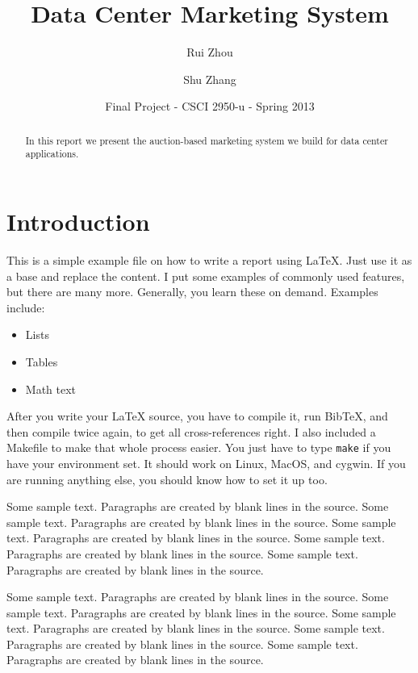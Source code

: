 \documentclass[11pt]{article}
\begin{document}
\title{Data Center Marketing System}
\author{Rui Zhou \and Shu Zhang}
\date{Final Project - CSCI 2950-u - Spring 2013}
\maketitle

\begin{abstract}
In this report we present the auction-based marketing system we build for data center applications.

\end{abstract}

\section{Introduction}
\label{sec:intro}
This is a simple example file on how to write a report using LaTeX.
Just use it as a base and replace the content. I put some examples of
commonly used features, but there are many more. Generally, you learn
these on demand. Examples include:

\begin{itemize}
\item Lists
\item Tables
\item Math text
\end{itemize}

After you write your LaTeX source, you have to compile it, run
BibTeX, and then compile twice again, to get all cross-references 
right. I also included a Makefile to make that whole process easier.
You just have to type \texttt{make} if you have your environment set.
It should work on Linux, MacOS, and cygwin. If you are running 
anything else, you should know how to set it up too.

Some sample text. Paragraphs are created by blank lines in the source.
Some sample text. Paragraphs are created by blank lines in the source.
Some sample text. Paragraphs are created by blank lines in the source.
Some sample text. Paragraphs are created by blank lines in the source.
Some sample text. Paragraphs are created by blank lines in the source.

Some sample text. Paragraphs are created by blank lines in the source.
Some sample text. Paragraphs are created by blank lines in the source.
Some sample text. Paragraphs are created by blank lines in the source.
Some sample text. Paragraphs are created by blank lines in the source.
Some sample text. Paragraphs are created by blank lines in the source.
\end{document}
